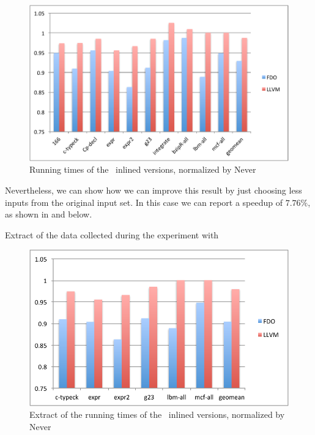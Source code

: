 \begin{figure}
  \centering
  \includegraphics[width=1.00\linewidth]{Figures/speedupgcc}
  \caption{Running times of the \gcc\ inlined versions, normalized by Never}
  \label{fig:speedupgcc}
\end{figure}

Nevertheless, we can show how we can improve this result by just choosing less inputs from the original input set. In this case we can report a speedup of $7.76 \%$, as shown in  and  below.

\begin{table}
  \centering
  \begin{tiny}
  
  \end{tiny}
  \caption{Extract of the data collected during the experiment with \gcc}
  \label{tab:speedupgcc1}
\end{table}

\begin{figure}
  \centering
  \includegraphics[width=1.00\linewidth]{Figures/speedupgcc1}
  \caption{Extract of the running times of the \gcc\ inlined versions, normalized by Never}
  \label{fig:speedupgcc1}
\end{figure}

